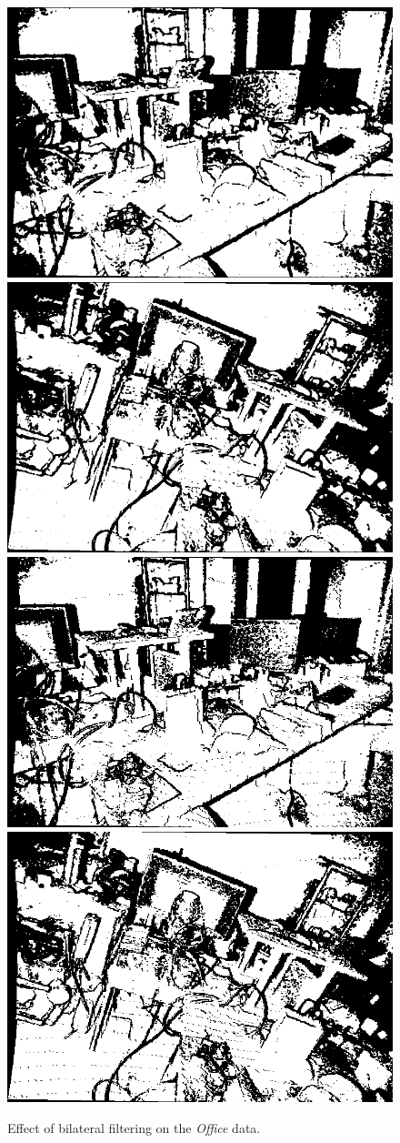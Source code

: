 \begin{figure}[H]
    \includegraphics[width=0.25\linewidth]{chapter06/results/conv_images/office/flexion/bl/0014.png}%
    \includegraphics[width=0.25\linewidth]{chapter06/results/conv_images/office/flexion/bl/0028.png}%
    \includegraphics[width=0.25\linewidth]{chapter06/results/conv_images/office/bearing/bl/0014.png}%
    \includegraphics[width=0.25\linewidth]{chapter06/results/conv_images/office/bearing/bl/0028.png}%
    \caption{Effect of bilateral filtering on the \emph{Office} data.}
\end{figure}
